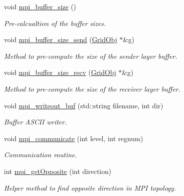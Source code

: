 \begin{DoxyCompactItemize}
void \hyperlink{class_mpi_manager_a1bf713399e26a5ffbc03147e0a20c585}{mpi\+\_\+buffer\+\_\+size} ()
\begin{DoxyCompactList}\small\item\em Pre-\/calcualtion of the buffer sizes. \end{DoxyCompactList}\item 
void \hyperlink{class_mpi_manager_af26d2a0a2430f7c1b5def5f954a10f1d}{mpi\+\_\+buffer\+\_\+size\+\_\+send} (\hyperlink{class_grid_obj}{Grid\+Obj} $\ast$\&g)
\begin{DoxyCompactList}\small\item\em Method to pre-\/compute the size of the sender layer buffer. \end{DoxyCompactList}\item 
void \hyperlink{class_mpi_manager_afa7547c05583bf6c52ea48cc1dc13336}{mpi\+\_\+buffer\+\_\+size\+\_\+recv} (\hyperlink{class_grid_obj}{Grid\+Obj} $\ast$\&g)
\begin{DoxyCompactList}\small\item\em Method to pre-\/compute the size of the receiver layer buffer. \end{DoxyCompactList}\item 
void \hyperlink{class_mpi_manager_ab498bdf0822e2747f83c187d682dd934}{mpi\+\_\+writeout\+\_\+buf} (std\+::string filename, int dir)
\begin{DoxyCompactList}\small\item\em Buffer A\+S\+C\+II writer. \end{DoxyCompactList}\item 
void \hyperlink{class_mpi_manager_aedcf84c06fc3e0486fac61d09ce0a268}{mpi\+\_\+communicate} (int level, int regnum)
\begin{DoxyCompactList}\small\item\em Communication routine. \end{DoxyCompactList}\item 
int \hyperlink{class_mpi_manager_a3c10ab477c2e4387d6a02104f9b2a2ea}{mpi\+\_\+get\+Opposite} (int direction)
\begin{DoxyCompactList}\small\item\em Helper method to find opposite direction in M\+PI topology. \end{DoxyCompactList}\end{DoxyCompactItemize}

